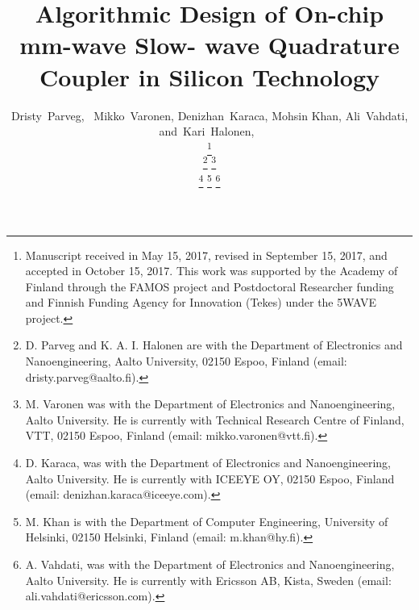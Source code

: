 \documentclass[journal]{IEEEtran}
\begin{document}
%
\title{Algorithmic Design of On-chip mm-wave Slow-
	wave Quadrature Coupler in Silicon Technology}
%
%
%

\author{Dristy~Parveg,~
        Mikko~Varonen, Denizhan~Karaca, Mohsin Khan, Ali~Vahdati,
        and~Kari~Halonen,~%

\thanks{Manuscript received in May 15, 2017, revised in September 15, 2017, and
	accepted  in  October  15,  2017.  This  work  was  supported  by  the  Academy  of
	Finland through the FAMOS project and Postdoctoral Researcher funding and
	Finnish Funding Agency for Innovation (Tekes) under the 5WAVE project.} 
	
\thanks{D. Parveg and K. A. I. Halonen are with the Department of Electronics  and  Nanoengineering,  Aalto  University,  02150  Espoo,  Finland  (email: dristy.parveg@aalto.fi).}%
\thanks{M. Varonen was with the Department of Electronics  and  Nanoengineering, Aalto
	University. He is currently with Technical Research Centre of Finland, VTT,
	02150 Espoo, Finland (email: mikko.varonen@vtt.fi).}%

\thanks{D. Karaca,  was  with  the  Department  of  Electronics  and  Nanoengineering,  Aalto University. He is currently with ICEEYE OY, 02150 Espoo, Finland (email:
	denizhan.karaca@iceeye.com).}%
\thanks{M. Khan is with the Department of Computer Engineering, University of Helsinki,
	02150 Helsinki, Finland (email: m.khan@hy.fi).}%
\thanks{A. Vahdati,  was  with  the  Department  of  Electronics  and  Nanoengineering,  Aalto University. He is currently with Ericsson AB, Kista, Sweden (email:
	ali.vahdati@ericsson.com).}}
\end{document}

